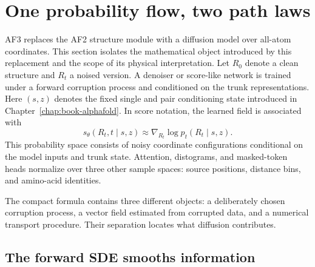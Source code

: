 \section{One probability flow, two path laws}
\label{sec:book-diffusion-transport}

AF3 replaces the AF2 structure module with a diffusion model over all-atom coordinates.  This
section isolates the mathematical object introduced by this replacement and the scope of its
physical interpretation.  Let $R_0$ denote a clean structure and $R_t$ a noised version.  A
denoiser or score-like network is trained under a forward corruption process and conditioned on the
trunk representations.  Here $(s,z)$ denotes the fixed single and pair conditioning state
introduced in Chapter~\ref{chap:book-alphafold}.  In score notation, the learned field is associated with
\begin{equation}
s_\theta(R_t,t\mid s,z)
\approx
\nabla_{R_t}\log p_t(R_t\mid s,z).
\label{eq:book-af3-score}
\end{equation}
This probability space consists of noisy coordinate configurations conditional on the model inputs
and trunk state.  Attention, distograms, and masked-token heads normalize over three other sample
spaces: source positions, distance bins, and amino-acid identities.

The compact formula contains three different objects: a deliberately chosen corruption process, a
vector field estimated from corrupted data, and a numerical transport procedure.  Their separation
locates what diffusion contributes.

\subsection{The forward SDE smooths information}

